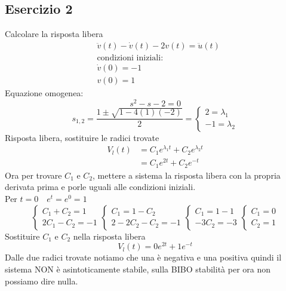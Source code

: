 	\subsection{Esercizio 2}
	Calcolare la risposta libera
		\[
		\begin{split}
		&\ddot{v}(t)-\dot{v}(t)-2v(t) = \ddot{u}(t)\\
		&\mathrm{condizioni \,\, iniziali:}\\
		&\dot{v}(0)=-1\\
		&v(0)=1
		\end{split}
		\]
		Equazione omogenea:
		\[s^2 - s - 2 = 0\]
		\[s_{1,2} = \frac{1\pm\sqrt{1-4(1)(-2)}}{2} =
		\begin{cases}
		2 = \lambda_1\\
		-1 = \lambda_2
		\end{cases}
		\]
		Risposta libera, sostituire le radici trovate
		\[
		\begin{split}
		V_l(t)&=C_1e^{\lambda_1t} + C_2e^{\lambda_2t}\\
		&=C_1e^{2t}+C_2e^{-t}
		\end{split}
		\]
		Ora per trovare $C_1$ e $C_2$, mettere a sistema la risposta libera con la propria derivata prima e porle uguali alle condizioni iniziali.\\
		Per $t=0 \quad e^t = e^0 = 1$
		\[
		\begin{cases}
		C_1 + C_2 = 1\\
		2C_1 - C_2= -1 
		\end{cases}
		\begin{cases}
		C_1 = 1-C_2\\
		2-2C_2-C_2 = -1
		\end{cases}
		\begin{cases}
		C_1 = 1-1\\
		-3C_2 = -3
		\end{cases}
		\begin{cases}
		C_1=0\\
		C_2 =1
		\end{cases}
		\]
		Sostituire $C_1$ e $C_2$ nella risposta libera
		\[V_l(t) = 0e^{2t}+1e^{-t}\]
		Dalle due radici trovate notiamo che una è negativa e una positiva quindi il sistema NON è asintoticamente stabile, sulla BIBO stabilità per ora non possiamo dire nulla.
		\newpage
